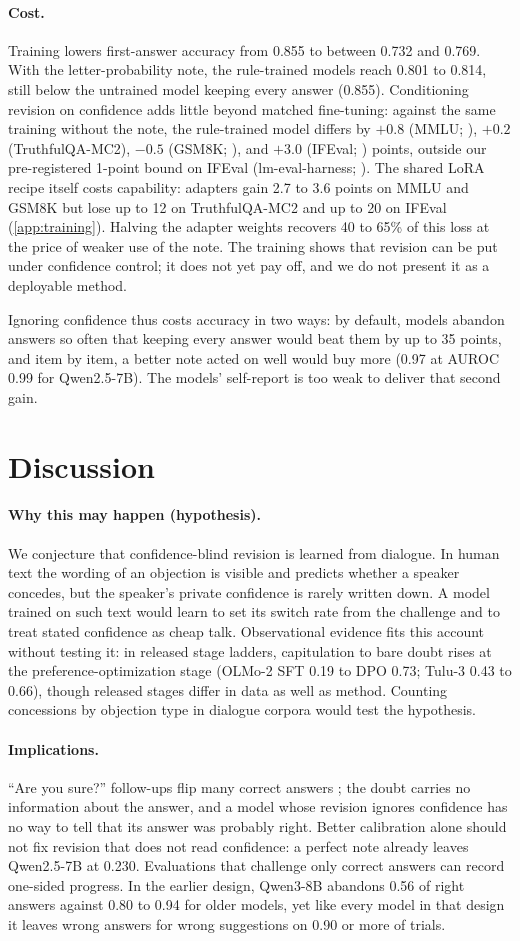 \documentclass{article} %
\newcommand{\para}[1]{\paragraph{#1}}
\begin{document}
\para{Cost.} Training lowers first-answer accuracy from 0.855 to between 0.732 and 0.769. With the letter-probability note, the rule-trained models reach 0.801 to 0.814, still below the untrained model keeping every answer (0.855). Conditioning revision on confidence adds little beyond matched fine-tuning: against the same training without the note, the rule-trained model differs by $+0.8$ (MMLU; \citealp{hendrycks2021mmlu}), $+0.2$ (TruthfulQA-MC2), $-0.5$ (GSM8K; \citealp{cobbe2021gsm8k}), and $+3.0$ (IFEval; \citealp{zhou2023ifeval}) points, outside our pre-registered 1-point bound on IFEval (lm-eval-harness; \citealp{biderman2024lessons}). The shared LoRA recipe itself costs capability: adapters gain 2.7 to 3.6 points on MMLU and GSM8K but lose up to 12 on TruthfulQA-MC2 and up to 20 on IFEval (\cref{app:training}). Halving the adapter weights recovers 40 to 65\% of this loss at the price of weaker use of the note. The training shows that revision can be put under confidence control; it does not yet pay off, and we do not present it as a deployable method.

Ignoring confidence thus costs accuracy in two ways: by default, models abandon answers so often that keeping every answer would beat them by up to 35 points, and item by item, a better note acted on well would buy more (0.97 at AUROC 0.99 for Qwen2.5-7B). The models' self-report is too weak to deliver that second gain.

\section{Discussion}
\label{sec:discussion}

\para{Why this may happen (hypothesis).} We conjecture that confidence-blind revision is learned from dialogue. In human text the wording of an objection is visible and predicts whether a speaker concedes, but the speaker's private confidence is rarely written down. A model trained on such text would learn to set its switch rate from the challenge and to treat stated confidence as cheap talk. Observational evidence fits this account without testing it: in released stage ladders, capitulation to bare doubt rises at the preference-optimization stage (OLMo-2 SFT 0.19 to DPO 0.73; Tulu-3 0.43 to 0.66), though released stages differ in data as well as method. Counting concessions by objection type in dialogue corpora would test the hypothesis.

\para{Implications.} ``Are you sure?'' follow-ups flip many correct answers \citep{laban2023flipflop, xie2024askagain}; the doubt carries no information about the answer, and a model whose revision ignores confidence has no way to tell that its answer was probably right. Better calibration alone should not fix revision that does not read confidence: a perfect note already leaves Qwen2.5-7B at 0.230. Evaluations that challenge only correct answers can record one-sided progress. In the earlier design, Qwen3-8B abandons 0.56 of right answers against 0.80 to 0.94 for older models, yet like every model in that design it leaves wrong answers for wrong suggestions on 0.90 or more of trials.
\end{document}
